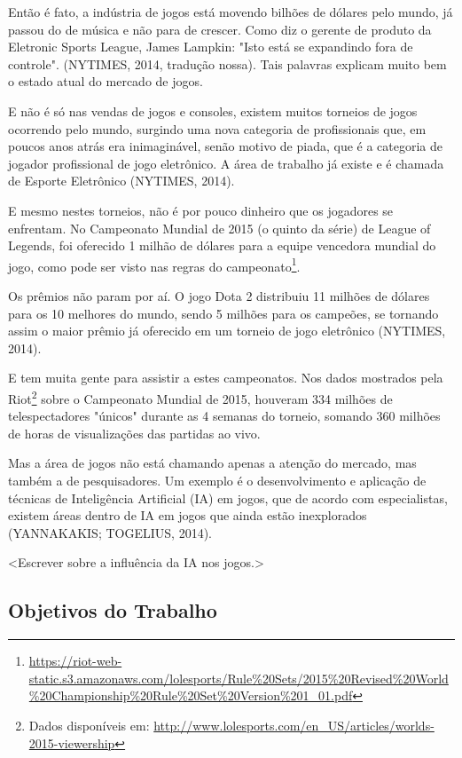 \documentclass[12pt,a4paper]{article}
\begin{document}
	Então é fato, a indústria de jogos está movendo bilhões de dólares pelo mundo,
	já passou do de música e não para de crescer.
	Como diz o gerente de produto da Eletronic Sports League, James Lampkin:
	"Isto está se expandindo fora de controle".
	(NYTIMES, 2014, tradução nossa).
	Tais palavras explicam muito bem o estado atual do mercado de jogos.
	
	E não é só nas vendas de jogos e consoles,
	existem muitos torneios de jogos ocorrendo pelo mundo,
	surgindo uma nova categoria de profissionais que,
	em poucos anos atrás era inimaginável, senão motivo de piada,
	que é a categoria de jogador profissional de jogo eletrônico.
	A área de trabalho já existe e é chamada de Esporte Eletrônico (NYTIMES, 2014).
	
	E mesmo nestes torneios, não é por pouco dinheiro que os jogadores se enfrentam.
	No Campeonato Mundial de 2015 (o quinto da série) de League of Legends,
	foi oferecido 1 milhão de dólares para a equipe vencedora mundial do jogo,
	como pode ser visto nas regras do campeonato\footnote{\url{https://riot-web-static.s3.amazonaws.com/lolesports/Rule\%20Sets/2015\%20Revised\%20World\%20Championship\%20Rule\%20Set\%20Version\%201\_01.pdf}}.
	
	Os prêmios não param por aí.
	O jogo Dota 2 distribuiu 11 milhões de dólares para os 10 melhores do mundo,
	sendo 5 milhões para os campeões,
	se tornando assim o maior prêmio já oferecido em um torneio de jogo eletrônico (NYTIMES, 2014).
	
	E tem muita gente para assistir a estes campeonatos.
	Nos dados mostrados pela Riot\footnote{Dados disponíveis em: \url{http://www.lolesports.com/en_US/articles/worlds-2015-viewership}}
	sobre o Campeonato Mundial de 2015,
	houveram 334 milhões de telespectadores "únicos" durante as 4 semanas do torneio,
	somando 360 milhões de horas de visualizações das partidas ao vivo.
	
	Mas a área de jogos não está chamando apenas a atenção do mercado,
	mas também a de pesquisadores.
	Um exemplo é o desenvolvimento e aplicação de técnicas de Inteligência Artificial (IA) em jogos,
	que de acordo com especialistas,
	existem áreas dentro de IA em jogos que ainda estão inexplorados (YANNAKAKIS; TOGELIUS, 2014).
	
	<Escrever sobre a influência da IA nos jogos.>

	\subsection{Objetivos do Trabalho}
	
\end{document}
